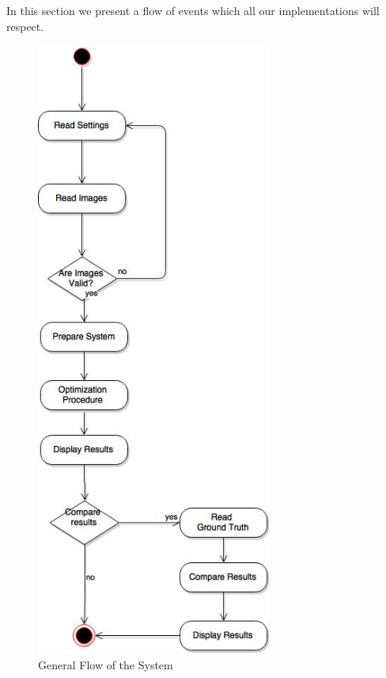 \documentclass[12pt,a4paper,twoside]{report}
\begin{document}
In this section we present a flow of events which all our implementations will respect.
 

\begin{figure} \label{fflow}
	\centering
	\includegraphics[height = 8in]{img/genFlow} 
	\caption{General Flow of the System}
\end{figure}
\end{document}
